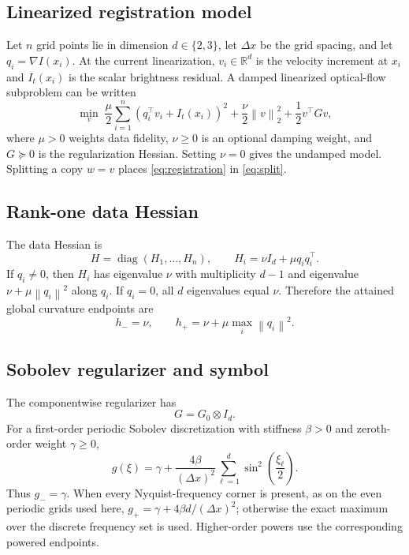 \documentclass[11pt]{article}
\theoremstyle{definition}
\newcommand{\R}{\mathbb{R}}
\newcommand{\norm}[1]{\left\lVert #1\right\rVert}
\newcommand{\diag}{\operatorname{diag}}
\begin{document}
\subsection{Linearized registration model}
Let $n$ grid points lie in dimension $d\in\{2,3\}$, let $\Delta x$ be the grid
spacing, and let $q_i=\nabla I(x_i)$. At the current linearization,
$v_i\in\R^d$ is the velocity increment at $x_i$ and $I_t(x_i)$ is the scalar
brightness residual. A damped linearized optical-flow subproblem can be written
\begin{equation}
\min_v\;
\frac{\mu}{2}\sum_{i=1}^n(q_i^\top v_i+I_t(x_i))^2
+\frac{\nu}{2}\norm{v}_2^2+\frac12v^\top Gv,
\label{eq:registration}
\end{equation}
where $\mu>0$ weights data fidelity, $\nu\ge0$ is an optional damping weight,
and $G\succeq0$ is the regularization Hessian. Setting $\nu=0$ gives the
undamped model.
Splitting a copy $w=v$ places \eqref{eq:registration} in
\eqref{eq:split}.

\subsection{Rank-one data Hessian}
The data Hessian is
\begin{equation}
H=\diag(H_1,\ldots,H_n),\qquad
H_i=\nu I_d+\mu q_iq_i^\top.
\label{eq:registration_H}
\end{equation}
If $q_i\ne0$, then $H_i$ has eigenvalue $\nu$ with multiplicity $d-1$ and
eigenvalue $\nu+\mu\norm{q_i}^2$ along $q_i$. If $q_i=0$, all $d$ eigenvalues
equal $\nu$. Therefore the attained global curvature endpoints are
\begin{equation}
h_-=\nu,\qquad h_+=\nu+\mu\max_i\norm{q_i}^2.
\label{eq:h_endpoints}
\end{equation}

\subsection{Sobolev regularizer and symbol}
The componentwise regularizer has
\[
G=G_0\otimes I_d.
\]
For a first-order periodic Sobolev discretization with stiffness $\beta>0$ and
zeroth-order weight $\gamma\ge0$,
\begin{equation}
g(\xi)=\gamma+
\frac{4\beta}{(\Delta x)^2}
\sum_{\ell=1}^d\sin^2\left(\frac{\xi_\ell}{2}\right).
\label{eq:sobolev_symbol}
\end{equation}
Thus $g_-=\gamma$. When every Nyquist-frequency corner is present, as on the
even periodic grids used here,
$g_+=\gamma+4\beta d/(\Delta x)^2$; otherwise the exact maximum over the
discrete frequency set is used. Higher-order powers use the corresponding
powered endpoints.
\end{document}

